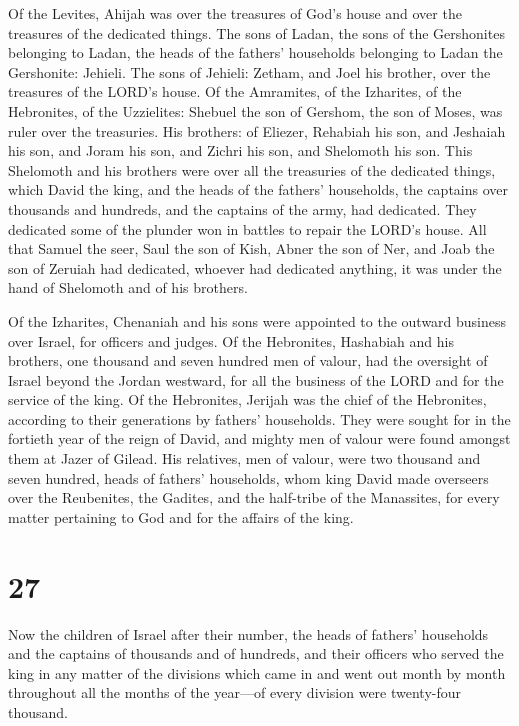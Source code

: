  Of the Levites, Ahijah was over the treasures of God's
house and over the treasures of the dedicated things.  The
sons of Ladan, the sons of the Gershonites belonging to Ladan, the heads
of the fathers' households belonging to Ladan the Gershonite: Jehieli.
 The sons of Jehieli: Zetham, and Joel his brother, over
the treasures of the LORD's house.  Of the Amramites, of
the Izharites, of the Hebronites, of the Uzzielites: 
Shebuel the son of Gershom, the son of Moses, was ruler over the
treasuries.  His brothers: of Eliezer, Rehabiah his son,
and Jeshaiah his son, and Joram his son, and Zichri his son, and
Shelomoth his son.  This Shelomoth and his brothers were
over all the treasuries of the dedicated things, which David the king,
and the heads of the fathers' households, the captains over thousands
and hundreds, and the captains of the army, had dedicated. 
They dedicated some of the plunder won in battles to repair the LORD's
house.  All that Samuel the seer, Saul the son of Kish,
Abner the son of Ner, and Joab the son of Zeruiah had dedicated, whoever
had dedicated anything, it was under the hand of Shelomoth and of his
brothers.

 Of the Izharites, Chenaniah and his sons were appointed to
the outward business over Israel, for officers and judges. 
Of the Hebronites, Hashabiah and his brothers, one thousand and seven
hundred men of valour, had the oversight of Israel beyond the Jordan
westward, for all the business of the LORD and for the service of the
king.  Of the Hebronites, Jerijah was the chief of the
Hebronites, according to their generations by fathers' households. They
were sought for in the fortieth year of the reign of David, and mighty
men of valour were found amongst them at Jazer of Gilead. 
His relatives, men of valour, were two thousand and seven hundred, heads
of fathers' households, whom king David made overseers over the
Reubenites, the Gadites, and the half-tribe of the Manassites, for every
matter pertaining to God and for the affairs of the king.

\hypertarget{section-26}{%
\section{27}\label{section-26}}

 Now the children of Israel after their number, the heads of
fathers' households and the captains of thousands and of hundreds, and
their officers who served the king in any matter of the divisions which
came in and went out month by month throughout all the months of the
year---of every division were twenty-four thousand.

